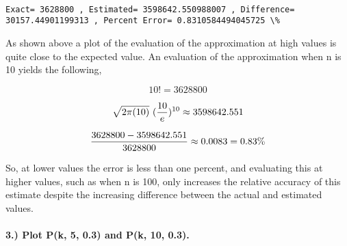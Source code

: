 \documentclass[11pt]{article}
\begin{document}
    \begin{center}
    \end{center}
    { \hspace*{\fill} \\}
    
    \begin{Verbatim}[commandchars=\\\{\}]
Exact= 3628800 , Estimated= 3598642.550988007 , Difference= 30157.44901199313 , Percent Error= 0.8310584494045725 \%

    \end{Verbatim}

    As shown above a plot of the evaluation of the approximation at high
values is quite close to the expected value. An evaluation of the
approximation when n is 10 yields the following,

\[ 10 ! = 3628800 \]

\[ \\ \sqrt{2 \pi  (10)} \ (\frac{10}{e})^{10} \approx 3598642.551 \\ \]

\[ \\ \frac{3628800 - 3598642.551}{3628800} \approx 0.0083 = 0.83 \% \\ \]

So, at lower values the error is less than one percent, and evaluating
this at higher values, such as when n is 100, only increases the
relative accuracy of this estimate despite the increasing difference
between the actual and estimated values.

    \paragraph{3.) Plot P(k, 5, 0.3) and P(k, 10,
0.3).}\label{plot-pk-5-0.3-and-pk-10-0.3.}
\end{document}
